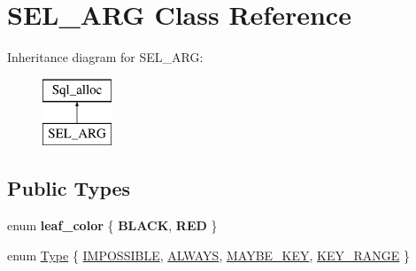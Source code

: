 \hypertarget{classSEL__ARG}{}\section{S\+E\+L\+\_\+\+A\+RG Class Reference}
\label{classSEL__ARG}
Inheritance diagram for S\+E\+L\+\_\+\+A\+RG\+:\begin{figure}[H]
\begin{center}
\leavevmode
\includegraphics[height=2.000000cm]{classSEL__ARG}
\end{center}
\end{figure}
\subsection*{Public Types}
\begin{DoxyCompactItemize}
\item 
\mbox{\label{classSEL__ARG_a7490f2291619f4c8de6f2e8fed34902e}} 
enum {\bfseries leaf\+\_\+color} \{ {\bfseries B\+L\+A\+CK}, 
{\bfseries R\+ED}
 \}
\item 
enum \mbox{\hyperlink{classSEL__ARG_ac3c2b193f810aece693ca18c6a1a9312}{Type}} \{ \mbox{\hyperlink{classSEL__ARG_ac3c2b193f810aece693ca18c6a1a9312ad50f65fbe3c63291a0d83af61a7def3b}{I\+M\+P\+O\+S\+S\+I\+B\+LE}}, 
\mbox{\hyperlink{classSEL__ARG_ac3c2b193f810aece693ca18c6a1a9312aa4c879a3200c2e2937c190083e0df32f}{A\+L\+W\+A\+YS}}, 
\mbox{\hyperlink{classSEL__ARG_ac3c2b193f810aece693ca18c6a1a9312acf45b33d3185a9ffec51c704f15c3330}{M\+A\+Y\+B\+E\+\_\+\+K\+EY}}, 
\mbox{\hyperlink{classSEL__ARG_ac3c2b193f810aece693ca18c6a1a9312a8df26c2efa2128d90d6dfe919ea6b833}{K\+E\+Y\+\_\+\+R\+A\+N\+GE}}
 \}
\end{DoxyCompactItemize}
